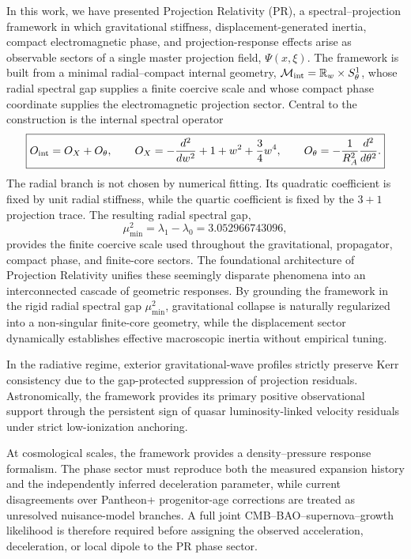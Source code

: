 \documentclass[11pt]{article}
\begin{document}
In this work, we have presented Projection Relativity (PR), a spectral--projection framework in which gravitational stiffness, displacement-generated inertia, compact electromagnetic phase, and projection-response effects arise as observable sectors of a single master projection field, $\Psi(x,\xi)$. The framework is built from a minimal radial--compact internal geometry,
\(\mathcal M_{\rm int}=\mathbb R_w\times S^1_\theta\), whose radial spectral gap supplies a finite coercive scale and whose compact phase coordinate supplies the electromagnetic projection sector. Central to the construction is the internal spectral operator
\begin{equation}
\boxed{
O_{\rm int}
=
O_X+O_\theta,
\qquad
O_X
=
-\frac{d^2}{dw^2}
+
1+w^2+\frac34w^4,
\qquad
O_\theta
=
-\frac{1}{R_A^2}
\frac{d^2}{d\theta^2}.
}
\end{equation}
The radial branch is not chosen by numerical fitting. Its quadratic coefficient is fixed by unit radial stiffness, while the quartic coefficient is fixed by the \(3+1\) projection trace. The resulting radial spectral gap, 
\begin{equation}
\boxed{
\mu_{\min}^2 = \lambda_1-\lambda_0 = 3.052966743096,
}
\end{equation}
provides the finite coercive scale used throughout the gravitational, propagator, compact phase, and finite-core sectors. The foundational architecture of Projection Relativity unifies these seemingly disparate phenomena into an interconnected cascade of geometric responses. By grounding the framework in the rigid radial spectral gap $\mu_{\min}^2$, gravitational collapse is naturally regularized into a non-singular finite-core geometry, while the displacement sector dynamically establishes effective macroscopic inertia without empirical tuning. 

In the radiative regime, exterior gravitational-wave profiles strictly preserve Kerr consistency due to the gap-protected suppression of projection residuals. Astronomically, the framework provides its primary positive observational support through the persistent sign of quasar luminosity-linked velocity residuals under strict low-ionization anchoring. 

At cosmological scales, the framework provides a density--pressure response formalism. The phase sector must reproduce both the measured expansion history and the independently inferred deceleration parameter, while current disagreements over Pantheon+ progenitor-age corrections are treated as unresolved nuisance-model branches. A full joint CMB--BAO--supernova--growth likelihood is therefore required before assigning the observed acceleration, deceleration, or local dipole to the PR phase sector. 
\end{document}
